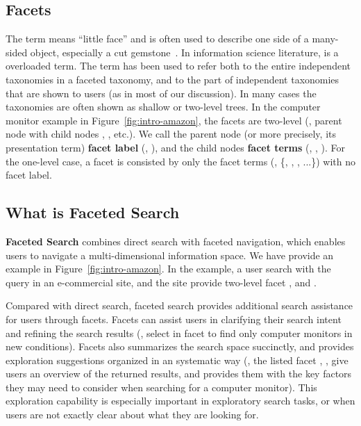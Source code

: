 \subsection{Facets}
The term  means ``little face'' and is often used to describe one side of a many-sided object, especially a cut gemstone~\cite{teevan2008challenges}. In information science literature,  is a overloaded term. The term has been used to refer both to the entire independent taxonomies in a faceted taxonomy, and to the part of independent taxonomies that are shown to users (as in most of our discussion). In many cases the taxonomies are often shown as shallow or two-level trees. In the computer monitor example in Figure~\ref{fig:intro-amazon}, the facets are two-level (\eg, parent node  with child nodes , , etc.). We call the parent node (or more precisely, its presentation term) \textbf{facet label} (\eg, ), and the child nodes \textbf{facet terms} (\eg, , ). For the one-level case, a facet is consisted by only the facet terms (\eg, \{, , , ...\}) with no facet label.


\subsection{What is Faceted Search}
\textbf{Faceted Search} combines direct search with faceted navigation, which enables users to navigate a multi-dimensional information space. We have provide an example in Figure~\ref{fig:intro-amazon}. In the example, a user search with the query  in an e-commercial site, and the site provide two-level facet ,  and .

Compared with direct search, faceted search provides additional search assistance for users through facets. Facets can assist users in clarifying their search intent and refining the search results (\eg, select  in facet  to find only computer monitors in new conditions). Facets also summarizes the search space succinctly, and provides exploration suggestions organized in an systematic way (\eg, the listed facet , ,  give users an overview of the returned results, and provides them with the key factors they may need to consider when searching for a computer monitor). This exploration capability is especially important in exploratory search tasks, or when users are not exactly clear about what they are 
looking for.

